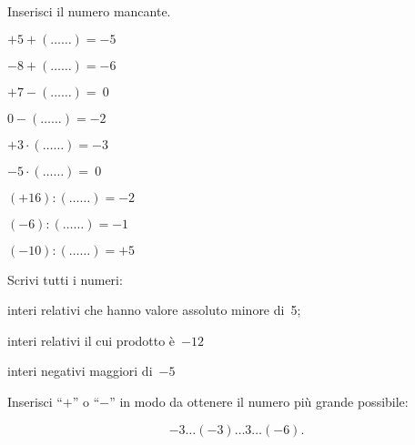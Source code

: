 \begin{esercizio}
Inserisci il numero mancante.

\vspace{-.5em}
 \begin{htmulticols}{3}
 \begin{enumeratees}
 \item \(+5 + (\ldots\ldots) = -5\)
 \item \(-8 + (\ldots\ldots) = -6\)
 \item \(+7 - (\ldots\ldots) =~0\)
 \item \(0 - (\ldots\ldots) = -2\)
 \item \(+3\cdot (\ldots\ldots) = -3\)
 \item \(-5\cdot (\ldots\ldots) =~0\)
 \item \((+16): (\ldots\ldots) = -2\)
 \item \((-6): (\ldots\ldots) = -1\)
 \item \((-10): (\ldots\ldots) = +5\)
 \end{enumeratees}
 \end{htmulticols}
\end{esercizio}

\begin{esercizio}
 Scrivi tutti i numeri:
 \begin{enumeratees}
 \item interi relativi che hanno valore assoluto minore di~5;
 \item interi relativi il cui prodotto è~\(-12\)
 \item interi negativi maggiori di~\(-5\)
 \end{enumeratees}
\end{esercizio}

\begin{esercizio}
Inserisci ``\(+\)'' o ``\(-\)'' in modo da ottenere il numero più grande 
possibile:

\vspace{-.5em}
 \[-3\ldots(-3)\ldots3\ldots(-6).\]
\end{esercizio}

